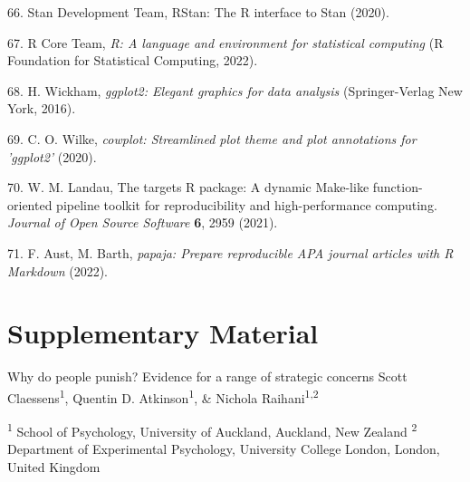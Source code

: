 \documentclass[
  english,
  man, donotrepeattitle,floatsintext]{apa6}
\newenvironment{cslreferences}%
  {}%
  {\par}
\begin{document}
\begin{cslreferences}
\leavevmode\hypertarget{ref-Stan2020}{}%
66. Stan Development Team, RStan: The R interface to Stan (2020).

\leavevmode\hypertarget{ref-RCoreTeam}{}%
67. R Core Team, \emph{R: A language and environment for statistical computing} (R Foundation for Statistical Computing, 2022).

\leavevmode\hypertarget{ref-Wickham2016}{}%
68. H. Wickham, \emph{ggplot2: Elegant graphics for data analysis} (Springer-Verlag New York, 2016).

\leavevmode\hypertarget{ref-Wilke2020}{}%
69. C. O. Wilke, \emph{cowplot: Streamlined plot theme and plot annotations for 'ggplot2'} (2020).

\leavevmode\hypertarget{ref-Landau2021}{}%
70. W. M. Landau, The targets R package: A dynamic Make-like function-oriented pipeline toolkit for reproducibility and high-performance computing. \emph{Journal of Open Source Software} \textbf{6}, 2959 (2021).

\leavevmode\hypertarget{ref-Aust2022}{}%
71. F. Aust, M. Barth, \emph{papaja: Prepare reproducible APA journal articles with R Markdown} (2022).
\end{cslreferences}

\endgroup

\newpage
\vspace*{60mm}

\renewcommand{\figurename}{Supplementary Figure}
\renewcommand{\tablename}{Supplementary Table}
\renewcommand{\thefigure}{S\arabic{figure}} \setcounter{figure}{0}
\renewcommand{\thetable}{S\arabic{table}} \setcounter{table}{0}
\renewcommand{\theequation}{S\arabic{equation}} \setcounter{equation}{0}

\hypertarget{supplementary-material}{%
\section{\texorpdfstring{\textbf{Supplementary Material}}{Supplementary Material}}\label{supplementary-material}}

\setcounter{page}{1}
\centering

\noindent \hspace*{25mm} \small Why do people punish? Evidence for a range of strategic concerns \newline
\hspace*{30mm} \small Scott Claessens\textsuperscript{1}, Quentin D. Atkinson\textsuperscript{1}, \& Nichola Raihani\textsuperscript{1,2} \newline
\raggedright
\noindent \footnotesize \textsuperscript{1} School of Psychology, University of Auckland, Auckland, New Zealand \newline
\noindent \footnotesize \textsuperscript{2} Department of Experimental Psychology, University College London, London, United Kingdom \newline
\end{document}
